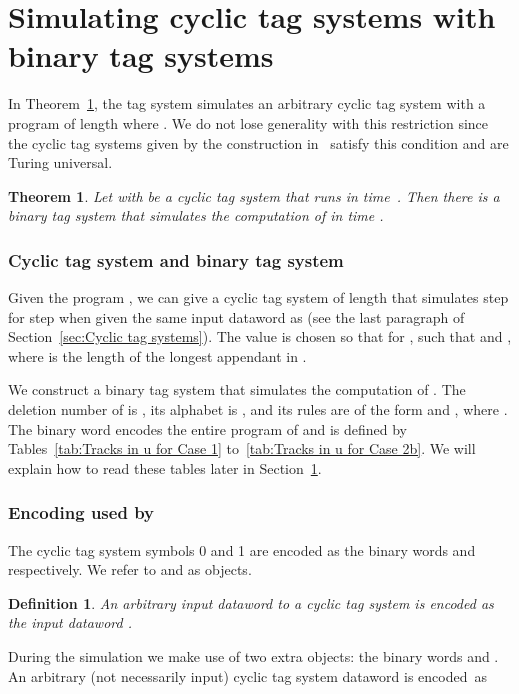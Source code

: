 \documentclass[11pt]{article} \usepackage{amsfonts,amsmath,amssymb,amsthm}
\newtheorem{theorem}{Theorem}
\newtheorem{definition}{Definition}
\begin{document}
\section{Simulating cyclic tag systems with binary tag systems}\label{sec:simulating CTS with TS} 

In Theorem~\ref{thm:main theorem}, the tag system  simulates an arbitrary cyclic tag system with a program of length  where . 
We do not lose generality with this restriction since the cyclic tag systems given by the construction in~\cite{NearyWoods2006C} satisfy this condition and are Turing universal. 


\begin{theorem}\label{thm:main theorem}
Let  with  be a cyclic tag system that runs in time~. Then there is a binary tag system  that simulates the computation of  in time .
\end{theorem}

\subsubsection{Cyclic tag system  and binary tag system }\label{sec:Cyclic tag system C'}
Given the program , we can give a cyclic tag system  of length  that simulates  step for step when given the same input dataword as  (see the last paragraph of Section~\ref{sec:Cyclic tag systems}). 
The value  is chosen so that  for , such that  and , where  is the length of the longest appendant in . 

We construct a binary tag system  that simulates the computation of . The deletion number of  is , its alphabet is , and its rules are of the form  and , where . The binary word  encodes the entire program of  and is defined by Tables~\ref{tab:Tracks in u for Case 1} to~\ref{tab:Tracks in u for Case 2b}. We will explain how to read these tables later in Section~\ref{sec:simulating CTS with TS}.




\subsubsection{Encoding used by }\label{sec:Encoding used by tag system}
The cyclic tag system symbols 0 and 1 are encoded as the binary words  and  respectively. We refer to  and  as objects.

\begin{definition}\label{def:input encoding}
An arbitrary input dataword  to a cyclic tag system is encoded as the  input dataword .
\end{definition}
During the simulation we make use of two extra objects: the binary words  and . An arbitrary (not necessarily input) cyclic tag system dataword  is encoded~as
\end{document}
